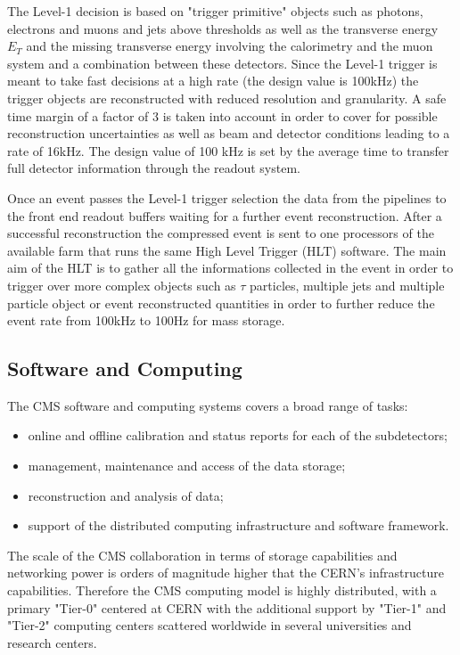 The Level-1 decision is based on "trigger primitive" objects such as photons, electrons and muons and jets above thresholds as well as the transverse energy $E_{T}$ and the missing transverse energy \met involving the calorimetry and the muon system and a combination between these detectors. Since the Level-1 trigger is meant to take fast decisions at a high rate (the design value is 100kHz) the trigger objects are reconstructed with reduced resolution and granularity. A safe time margin of a factor of 3 is taken into account in order to cover for possible reconstruction uncertainties as well as beam and detector conditions leading to a rate of 16kHz. The design value of 100 kHz is set by the average time to transfer full detector information through the readout system.

Once an event passes the Level-1 trigger selection the data from the pipelines to the front end readout buffers waiting for a further event reconstruction. After a successful reconstruction the compressed event is sent to one processors of the available farm that runs the same High Level Trigger (HLT) software. The main aim of the HLT is to gather all the informations collected in the event in order to trigger over more complex objects such as $\tau$ particles, multiple jets and multiple particle object or event reconstructed quantities in order to further reduce the event rate from 100kHz to 100Hz for mass storage.

\clearpage

\subsection{Software and Computing}

The CMS software and computing systems covers a broad range of tasks:

\begin{itemize}
	\item online and offline calibration and status reports for each of the subdetectors;
	\item management, maintenance and access of the data storage;
	\item reconstruction and analysis of data;
	\item support of the distributed computing infrastructure and software framework.
\end{itemize}

The scale of the CMS collaboration in terms of storage capabilities and networking power is orders of magnitude higher that the CERN's infrastructure capabilities. Therefore the CMS computing model is highly distributed, with a primary "Tier-0" centered at CERN with the additional support by "Tier-1" and "Tier-2" computing centers scattered worldwide in several universities and research centers. 

